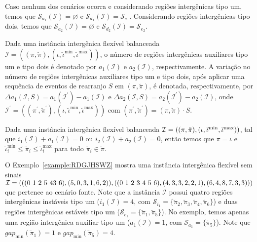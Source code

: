 Caso nenhum dos cenários ocorra e considerando regiões intergênicas tipo um, temos que $\mathcal{S}_{a_{1}}(\mathcal{I})=\varnothing$ e $ \mathcal{S}_{d_{1}}(\mathcal{I}) = \mathcal{S}_{e_{1}}$. Considerando regiões intergênicas tipo dois, temos que $\mathcal{S}_{a_{2}}(\mathcal{I}) =\varnothing$ e $\mathcal{S}_{d_{2}}(\mathcal{I}) = \mathcal{S}_{e_{2}}$.

Dada uma instância intergênica flexível balanceada $\mathcal{I} = ((\pi,\breve\pi),(\iota,\breve\iota^{\min},\breve\iota^{\max}))$, o número de regiões intergênicas auxiliares tipo um e tipo dois é denotado por $a_1(\mathcal{I})$ e $a_2(\mathcal{I})$, respectivamente. A variação no número de regiões intergênicas auxiliares tipo um e tipo dois, após aplicar uma sequência de eventos de rearranjo $S$ em $(\pi,\breve\pi)$, é denotada, respectivamente, por $\Delta a_1(\mathcal{I},S) = a_1(\mathcal{I}^{\prime}) - a_1(\mathcal{I})$ e $\Delta a_2(\mathcal{I},S) = a_2(\mathcal{I}^{\prime}) - a_2(\mathcal{I})$, onde $\mathcal{I}^{\prime} = ((\pi^{\prime}, \breve\pi^{\prime}),(\iota,\breve\iota^{\min},\breve\iota^{\max}))$ com $(\pi^{\prime}, \breve\pi^{\prime}) = (\pi, \breve\pi) \cdot S$.

\begin{remark}\label{remark:PGEYZJME}
Dada uma instância intergênica flexível balanceada $\mathcal{I} = ((\pi,\breve\pi),(\iota,\breve\iota^{\min},\break\breve\iota^{\max}))$, tal que $i_1(\mathcal{I}) + a_1(\mathcal{I}) = 0$ ou $i_2(\mathcal{I}) + a_2(\mathcal{I}) = 0$, então temos que $\pi = \iota$ e $\breve\iota^{\min}_i \le \breve\pi_i \le \breve\iota^{\max}_i$ para todo $\breve\pi_i \in \breve\pi$.
\end{remark}

O Exemplo~\ref{example:RDGJHSWZ} mostra uma instância intergênica flexível sem sinais $\mathcal{I} = (((0~1~2~5~4\break3~6),(5,0,3,1,6,2)),((0~1~2~3~4~5~6),(4,3,3,2,2,1),(6,4,8,7,3,3)))$ que pertence ao cenário fonte. Note que a instância $\mathcal{I}$ possui quatro regiões intergênicas instáveis tipo um ($i_1(\mathcal{I}) = 4$, com $\mathcal{S}_{i_{1}}=\{\breve\pi_2,\breve\pi_3,\breve\pi_4,\breve\pi_6\}$) e duas regiões intergênicas estáveis tipo um ($\mathcal{S}_{e_{1}}=\{\breve\pi_1,\breve\pi_5\}$). No exemplo, temos apenas uma região intergênica auxiliar tipo um ($a_1(\mathcal{I}) = 1$, com $\mathcal{S}_{a_{1}}=\{\breve\pi_5\}$). Note que $gap_{\min}(\breve\pi_1) = 1$ e $gap_{\min}(\breve\pi_5) = 4$.



